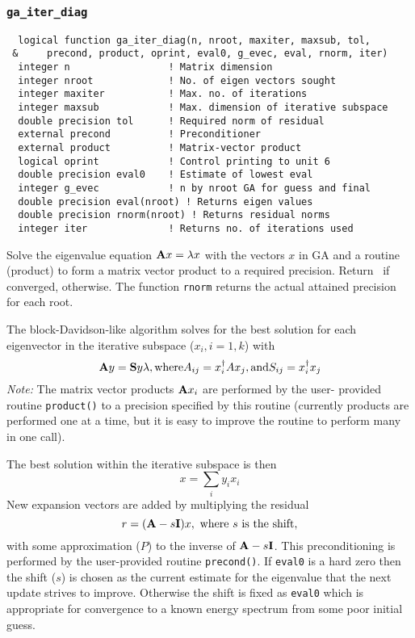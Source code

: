 \subsubsection{{\tt ga\_iter\_diag}}
\begin{verbatim}
  logical function ga_iter_diag(n, nroot, maxiter, maxsub, tol,
 &     precond, product, oprint, eval0, g_evec, eval, rnorm, iter)
  integer n                 ! Matrix dimension
  integer nroot             ! No. of eigen vectors sought
  integer maxiter           ! Max. no. of iterations
  integer maxsub            ! Max. dimension of iterative subspace
  double precision tol      ! Required norm of residual
  external precond          ! Preconditioner
  external product          ! Matrix-vector product
  logical oprint            ! Control printing to unit 6
  double precision eval0    ! Estimate of lowest eval
  integer g_evec            ! n by nroot GA for guess and final
  double precision eval(nroot) ! Returns eigen values
  double precision rnorm(nroot) ! Returns residual norms
  integer iter              ! Returns no. of iterations used
\end{verbatim}
  Solve the eigenvalue equation ${\bf A}x = \lambda x$ with the
vectors $x$ in GA and a routine (product) to form a matrix vector
product to a required precision.  Return \TRUE\ if converged, \FALSE
otherwise. The function \verb+rnorm+ returns the actual attained precision for each root.
     
The block-Davidson-like algorithm solves for the best solution for
each eigenvector in the iterative subspace ($x_i, i = 1, k$) with
\begin{displaymath}
  {\bf A} y = {\bf S}y\lambda, \mbox{where} A_{ij} = x_i^{\dagger} A x_j,
\mbox{and} S_{ij} = x_i^{\dagger} x_j
\end{displaymath}
{\em Note:} The matrix vector products ${\bf A}x_i$ are performed by the user-
provided routine \verb+product()+ to a precision specified by this routine
(currently products are performed one at a time, but it is easy to
improve the routine to perform many in one call).
     
The best solution within the iterative subspace is then
\begin{displaymath}
  x = \sum_i y_i x_i
\end{displaymath}
New expansion vectors are added by multiplying the residual
\begin{displaymath}
  r = ({\bf A} - s {\bf I}) x, \mbox{ where } s \mbox{ is the shift},
\end{displaymath}
with some approximation ($P$) to the inverse of ${\bf A}-s{\bf I}$.
This preconditioning is performed by the user-provided routine
\verb+precond()+.  If \verb+eval0+ is a hard zero then the shift ($s$) is
chosen as the current estimate for the eigenvalue that the next update
strives to improve.  Otherwise the shift is fixed as \verb+eval0+
which is appropriate for convergence to a known energy spectrum from
some poor initial guess.
     
